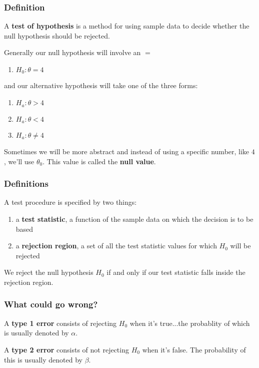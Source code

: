 \documentclass{beamer}
\begin{document}
\begin{frame}
\frametitle{Definition}

A \textbf{test of hypothesis} is a method for using sample data to decide whether the null hypothesis should be rejected.
\newline

Generally our null hypothesis will involve an $=$
\begin{enumerate}
\item $H_0: \theta = 4$
\end{enumerate}
and our alternative hypothesis will take one of the three forms:
\begin{enumerate}
\item $H_a: \theta > 4$
\item $H_a: \theta < 4$
\item $H_a: \theta \neq 4$
\end{enumerate}

Sometimes we will be more abstract and instead of using a specific number, like $4$, we'll use $\theta_0$. This value is called the \textbf{null value}.

\end{frame}


\begin{frame}
\frametitle{Definitions}

A test procedure is specified by two things:
\begin{enumerate}
\item a \textbf{test statistic}, a function of the sample data on which the decision is to be based
\item a \textbf{rejection region}, a set of all the test statistic values for which $H_0$ will be rejected
\end{enumerate}

We reject the null hypothesis $H_0$ if and only if our test statistic falls inside the rejection region.
\end{frame}

\begin{frame}
\frametitle{What could go wrong?}

A \textbf{type 1 error} consists of rejecting $H_0$ when it's true...the probablity of which is usually denoted by $\alpha$.
\newline

A \textbf{type 2 error} consists of not rejecting $H_0$ when it's false. The probability of this is usually denoted by $\beta$.

\end{frame}
\end{document}
